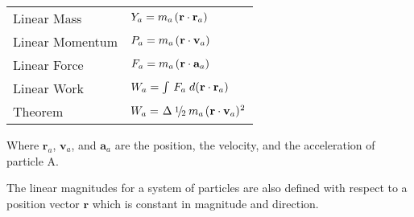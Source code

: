 \documentclass[10pt]{article}
\newcommand{\mM}{m}
\newcommand{\mY}{Y}
\newcommand{\mP}{P}
\newcommand{\mF}{F}
\newcommand{\mW}{W}
\newcommand{\ra}{_a}
\newcommand{\vR}{\mathbf{r}}
\newcommand{\vV}{\mathbf{v}}
\newcommand{\vA}{\mathbf{a}}
\newcommand{\med}{\raise.5ex\hbox{$\scriptstyle 1$}\kern-.15em/\kern-.15em\lower.25ex\hbox{$\scriptstyle 2$}}
\begin{document}
\begin{center}
\begin{tabular}{ll}
Linear Mass & \hspace{+1.20em} $\mY\ra = \mM\ra \hspace{+0.12em} (\hspace{+0.03em} \vR \cdot \vR\ra)$ \vspace{+0.90em} \\
Linear Momentum & \hspace{+1.20em} $\mP\ra = \mM\ra \hspace{+0.12em} (\hspace{+0.03em} \vR \cdot \vV\ra)$ \vspace{+0.90em} \\
Linear Force & \hspace{+1.20em} $\mF\ra = \mM\ra \hspace{+0.12em} (\hspace{+0.03em} \vR \cdot \vA\ra)$ \vspace{+0.90em} \\
Linear Work & \hspace{+1.20em} $\mW\ra = \int \hspace{+0.18em} \mF\ra \hspace{+0.27em} d(\hspace{+0.03em} \vR \cdot \vR\ra)$ \vspace{+0.90em} \\
Theorem & \hspace{+1.20em} $\mW\ra = \hspace{+0.09em} \Delta \hspace{+0.24em} \med \hspace{+0.24em} \mM\ra \hspace{+0.12em} (\hspace{+0.03em} \vR \cdot \vV\ra)^{\hspace{+0.03em} 2}$
\end{tabular}
\end{center}

\vspace{+0.60em}

\par Where $\vR\ra$, $\vV\ra$, and $\vA\ra$ are the position, the velocity, and the acceleration of particle A.
\medskip
\par The linear magnitudes for a system of particles are also defined with respect to a position vector $\vR$ which is constant in magnitude and direction.

\newpage
\end{document}
